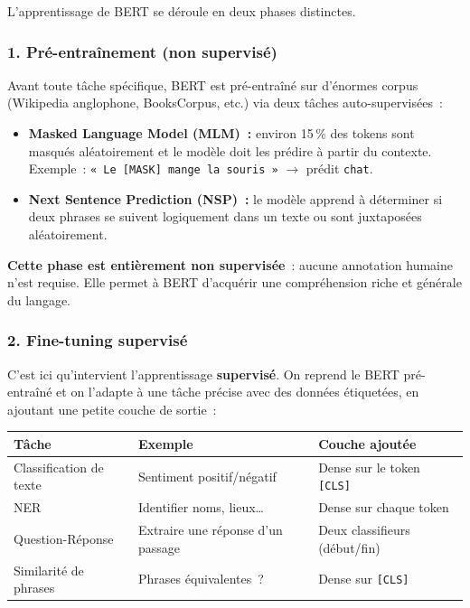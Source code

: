 \documentclass[12pt,a4paper]{report}
\begin{document}
L'apprentissage de BERT se déroule en deux phases distinctes.

\subsubsection{1. Pré-entraînement (non supervisé)}

Avant toute tâche spécifique, BERT est pré-entraîné sur d'énormes corpus (Wikipedia
anglophone, BooksCorpus, etc.) via deux tâches auto-supervisées~:

\begin{itemize}[leftmargin=1.5cm]
  \item \textbf{Masked Language Model (MLM)~:} environ 15\,\% des tokens sont masqués
    aléatoirement et le modèle doit les prédire à partir du contexte.
    Exemple~: \texttt{« Le [MASK] mange la souris »} $\rightarrow$ prédit \texttt{chat}.
  \item \textbf{Next Sentence Prediction (NSP)~:} le modèle apprend à déterminer si
    deux phrases se suivent logiquement dans un texte ou sont juxtaposées aléatoirement.
\end{itemize}

\textbf{Cette phase est entièrement non supervisée}~: aucune annotation humaine n'est requise.
Elle permet à BERT d'acquérir une compréhension riche et générale du langage.

\subsubsection{2. Fine-tuning supervisé}

C'est ici qu'intervient l'apprentissage \textbf{supervisé}. On reprend le BERT pré-entraîné
et on l'adapte à une tâche précise avec des données étiquetées, en ajoutant une petite
couche de sortie~:

\begin{center}
\begin{tabular}{@{}L{6cm}L{4.5cm}L{5cm}@{}}
  \toprule
  Tâche & Exemple & Couche ajoutée \\
  \midrule
  Classification de texte & Sentiment positif/négatif & Dense sur le token \texttt{[CLS]} \\
  NER\footnotemark & Identifier noms, lieux\ldots & Dense sur chaque token \\
  Question-Réponse & Extraire une réponse d'un passage & Deux classifieurs (début/fin) \\
  Similarité de phrases & Phrases équivalentes~? & Dense sur \texttt{[CLS]} \\
  \bottomrule
\end{tabular}
\end{center}
\end{document}
